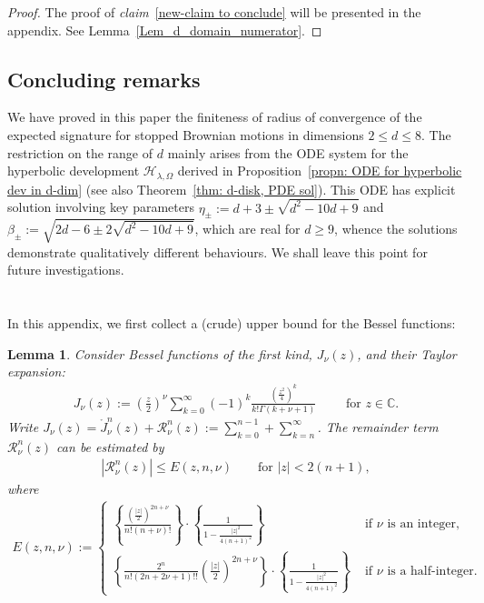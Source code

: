 \documentclass[11pt,a4paper,english,reqno]{amsart}
\theoremstyle{plain}
\newtheorem{lemma}[definition]{Lemma}
\newcommand{\C}{\mathbb{C}}
\newcommand{\G}{\Gamma}
\newcommand{\1}{\mathbbm{1}}
\begin{document}
\begin{proof}
The proof of \emph{claim}~\eqref{new-claim to conclude} will be presented in the appendix. See Lemma~\ref{Lem_d_domain_numerator}.  \end{proof}


\subsection{Concluding remarks}
We have proved in this paper the finiteness of radius of convergence of the expected signature for stopped Brownian motions in dimensions $2 \leq d \leq 8$. The restriction on the range of  $d$ mainly arises from the ODE system for the hyperbolic development $\mathcal{H}_{\lambda,\Omega}$ derived in Proposition~\ref{propn: ODE for hyperbolic dev in d-dim} (see also Theorem~\ref{thm: d-disk, PDE sol}). This ODE has explicit solution involving key parameters $\eta_\pm:= d+3 \pm \sqrt{d^2-10d+9}$ and $\beta_\pm:=\sqrt{2d-6 \pm 2 \sqrt{d^2-10d+9}}$, which are real for $d \geq 9$, whence the solutions demonstrate qualitatively different behaviours. We shall leave this point for future investigations. 



\appendix
\section{ }

In this appendix, we first collect a (crude) upper bound for the Bessel functions:

\begin{lemma}\label{lem: bessel}
Consider Bessel functions of the first kind, $J_\nu(z)$, and their Taylor expansion:
\begin{align*}
{J}_\nu(z)  := \left(\frac{z}{2}\right)^\nu \sum_{k=0}^{\infty} (-1)^k \frac{\left(\frac{z^2}{4}\right)^k}{k! \G(k+\nu+1)}\qquad \text{ for $z \in \C$}.
\end{align*} 
Write $J_{\nu}(z) = \mathring{J}_\nu^n(z) + \mathscr{R}_\nu^n(z) := \sum_{k=0}^{n-1} + \sum_{k=n}^{\infty}$. The remainder term $\mathscr{R}_\nu^n(z)$ can be estimated by
\begin{align*}
\left|\mathscr{R}_\nu^n(z)\right| \leq E(z, n, \nu)\qquad \text{for $|z|<2(n+1)$}, 
\end{align*}
where
\begin{eqnarray*}
E(z, n, \nu) := \begin{cases}
\left\{ \frac{\left(\frac{|z|}{2}\right)^{2n+\nu}}{n!(n+\nu)!}\right\} \cdot \left\{ \frac{1}{1-\frac{|z|^2}{4(n+1)^2}} \right\} &\text{ if $\nu$ is an integer},\\
\left\{\frac{2^n}{{n! (2n+2\nu+1)!!}} \left(\frac{|z|}{2}\right)^{2n+\nu}\right\}\cdot \left\{\frac{1}{1- \frac{|z|^2}{4(n+1)^2}}\right\} & \text{ if $\nu$ is a half-integer}.
\end{cases}
\end{eqnarray*}
\end{lemma}
\end{document}
